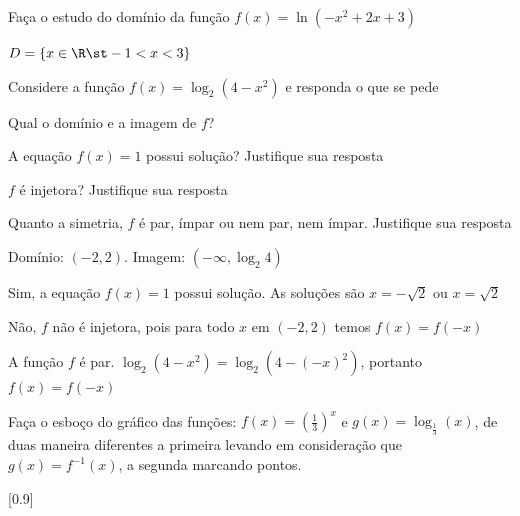 \begin{exercises*}
\begin{exercise}
  Faça o estudo do domínio da função \(f(x) = \ln \left( -x^2 + 2x + 3 \right)\)

  \begin{answer}
    $D = \{x \in \R \st -1<x<3 \}$
  \end{answer}
\end{exercise}

\begin{exercise}
  Considere a função $f(x)=\log_2(4-x^2)$ e responda o que se pede
  \begin{alphalist}
    \item Qual o domínio e a imagem de $f$?
    \item A equação $f(x)=1$ possui solução? Justifique sua resposta
    \item $f$ é injetora? Justifique sua resposta
    \item Quanto a simetria, $f$ é par, ímpar ou nem par, nem ímpar.
          Justifique sua resposta
  \end{alphalist}

  \begin{answer}
    \begin{alphalist}
      \item Domínio: $(-2, 2)$. Imagem: $(-\infty, \log_2 4)$
      \item Sim, a equação $f(x)=1$ possui solução.
            As soluções são $x=-\sqrt{2}$ ou $x=\sqrt{2}$
      \item Não, $f$ não é injetora, pois para todo $x$
            em $(-2,2)$ temos $f(x)=f(-x)$
      \item A função $f$ é par.
            $\log_2(4-x^2)=\log_2(4-(-x)^2)$, portanto $f(x)=f(-x)$
    \end{alphalist}
  \end{answer}
\end{exercise}

\begin{exercise}
  Faça o esboço do gráfico das funções:
  $f(x)= \left( \frac{1}{3} \right)^x$ e
  $g(x)=\log_{\frac{1}{3}}(x)$,
  de duas maneira diferentes a primeira levando em consideração que
  $g(x)=f^{-1}(x)$, a segunda marcando pontos.

  \begin{answer}
    [0.9]
  \end{answer}
\end{exercise}


\end{exercises*}
